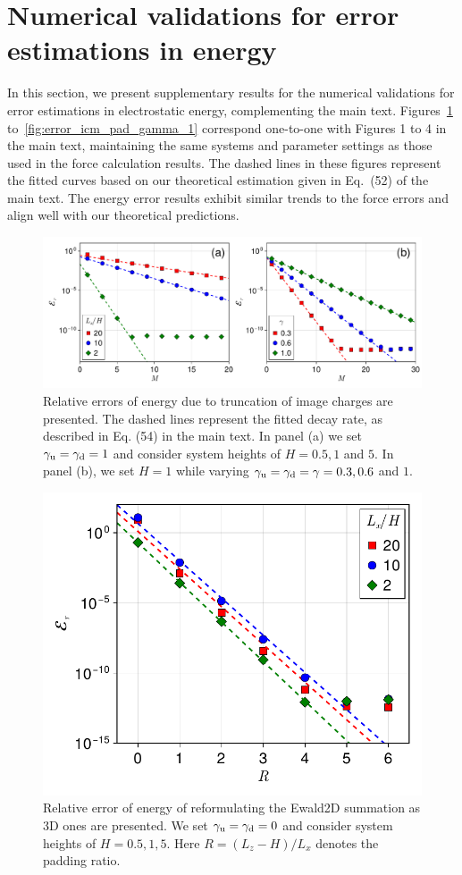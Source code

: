 \section{Numerical validations for error estimations in energy}\label{sec:numeric_energy}

In this section, we present supplementary results for the numerical validations for error estimations in electrostatic energy, complementing the main text. Figures~\ref{fig:icm_error} to~\ref{fig:error_icm_pad_gamma_1} correspond one-to-one with Figures 1 to 4 in the main text, maintaining the same systems and parameter settings as those used in the force calculation results. The dashed lines in these figures represent the fitted curves based on our theoretical estimation given in Eq.~(52) of the main text. The energy error results exhibit similar trends to the force errors and align well with our theoretical predictions.


\begin{figure}[htbp]
    \centering
    \includegraphics[width=0.98\linewidth]{figs/icm_error.pdf}
    \caption{
        Relative errors of energy due to truncation of image charges are presented. The dashed lines represent the fitted decay rate, as described in Eq. (54) in the main text. In panel (a) we set $\gamma_{\text{u}} = \gamma_{\text{d}} = 1$ and consider system heights of $H = 0.5, 1$ and $5$. In panel (b), we set $H = 1$ while varying $\gamma_{\text{u}} = \gamma_{\text{d}} = \gamma = 0.3, 0.6$ and $1$. 
    }
    \label{fig:icm_error}
\end{figure}


\begin{figure}[htbp]
    \centering
    \includegraphics[width=0.49\linewidth]{figs/elc_error.pdf}
    \caption{Relative error of energy of reformulating the Ewald2D summation as 3D ones are presented. We set $\gamma_{\text{u}} = \gamma_{\text{d}} = 0$ and consider system heights of $H = 0.5, 1, 5$. Here $R = (L_z - H) / L_x$ denotes the padding ratio.}
    \label{fig:elc_error}
\end{figure}

